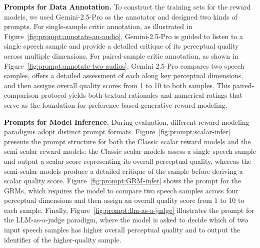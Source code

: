 \textbf{Prompts for Data Annotation.}
To construct the training sets for the reward models, we used Gemini-2.5-Pro as the annotator and designed two kinds of prompts. For single-sample critic annotation, as illustrated in Figure~\ref{fig:prompt:annotate-an-audio}, Gemini-2.5-Pro is guided to listen to a single speech sample and provide a detailed critique of its perceptual quality across multiple dimensions. For paired-sample critic annotation, as shown in Figure~\ref{fig:prompt:annotate-two-audios}, Gemini-2.5-Pro compares two speech samples, offers a detailed assessment of each along key perceptual dimensions, and then assigns overall quality scores from 1 to 10 to both samples. This paired-comparison protocol yields both textual rationales and numerical ratings that serve as the foundation for preference-based generative reward modeling.

\textbf{Prompts for Model Inference.}
During evaluation, different reward-modeling paradigms adopt distinct prompt formats.
Figure~\ref{fig:prompt:scalar-infer} presents the prompt structure for both the Classic scalar reward models and the semi-scalar reward models: the Classic scalar models assess a single speech sample and output a scalar score representing its overall perceptual quality, whereas the semi-scalar models produce a detailed critique of the sample before deriving a scalar quality score. Figure~\ref{fig:prompt:GRM-infer} shows the prompt for the GRMs, which requires the model to compare two speech samples across four perceptual dimensions and then assign an overall quality score from 1 to 10 to each sample. Finally, Figure~\ref{fig:prompt:llm-as-a-judge} illustrates the prompt for the LLM-as-a-judge paradigm, where the model is asked to decide which of two input speech samples has higher overall perceptual quality and to output the identifier of the higher-quality sample.








